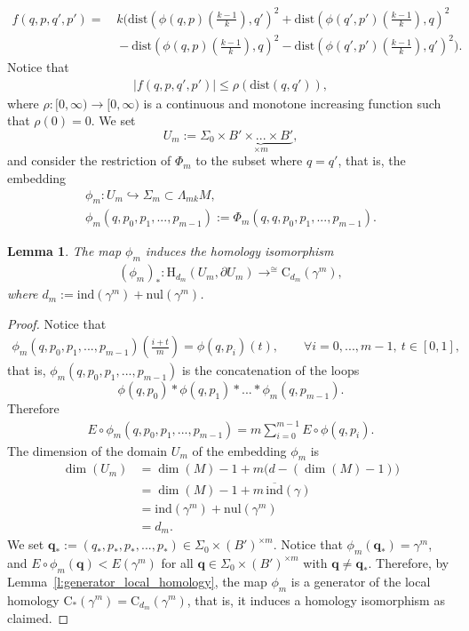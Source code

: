 \documentclass[reqno]{amsart}
\numberwithin{equation}{section}
\theoremstyle{personal}%
\newtheorem{lem}[thm]{Lemma}
\theoremstyle{definition}
\newcommand{\dist}{\mathrm{dist}}
\newcommand{\qq}{\bm{q}}
\newcommand{\Hom}{\mathrm{H}}
\newcommand{\Loc}{\mathrm{C}}
\newcommand{\avind}{\overline{\ind}}
\newcommand{\ind}{\mathrm{ind}}
\newcommand{\nul}{\mathrm{nul}}
\DeclareMathOperator*{\toup}{\longrightarrow}
\begin{document}
\begin{align*}
f(q,p,q',p')
=
&\, k
\Big(\dist(\phi(q,p)(\tfrac{k-1}{k}),q')^2 + \dist(\phi(q',p')(\tfrac{k-1}{k}),q)^2 \\
&
\,- \dist(\phi(q,p)(\tfrac{k-1}{k}),q)^2
- \dist(\phi(q',p')(\tfrac{k-1}{k}),q')^2
\Big).
\end{align*}
Notice that 
\begin{align}
\label{e:control_f}
|f(q,p,q',p')|\leq \rho(\dist(q,q')),
\end{align}
where $\rho:[0,\infty)\to[0,\infty)$ is a continuous and monotone increasing function such that $\rho(0)=0$.
We set 
\[
U_m:=\Sigma_0\times \underbrace{B'\times...\times B'}_{\times m},
\] 
and consider the restriction of $\Phi_m$ to the subset where $q=q'$, that is, the embedding
\begin{gather*}
\phi_m:U_m\hookrightarrow\Sigma_m\subset \Lambda_{mk}M,
\\
\phi_m(q,p_0,p_1,...,p_{m-1}):=\Phi_m(q,q,p_0,p_1,...,p_{m-1}).
\end{gather*}

\begin{lem}
The map $\phi_m$ induces the homology isomorphism
\begin{align*}
 (\phi_m)_*: \Hom_{d_m}(U_m,\partial U_m) \toup^{\cong} \Loc_{d_m}(\gamma^m),
\end{align*}
where $d_m:=\ind(\gamma^m)+\nul(\gamma^m)$.
\end{lem}

\begin{proof}
Notice that
\begin{align*}
\phi_m(q,p_0,p_1,...,p_{m-1})(\tfrac{i+t}m)
=
\phi(q,p_i)(t),\qquad
\forall i=0,...,m-1,\ t\in[0,1],
\end{align*}
that is, $\phi_m(q,p_0,p_1,...,p_{m-1})$ is the  concatenation of the loops 
\[\phi(q,p_0)*\phi(q,p_1)*...*\phi_m(q,p_{m-1}).\] Therefore
\begin{align*}
E\circ \phi_m(q,p_0,p_1,...,p_{m-1}) = m\sum_{i=0}^{m-1}E\circ\phi(q,p_i). 
\end{align*}
The dimension of the domain $U_m$ of the embedding $\phi_m$ is
\begin{align*}
 \dim(U_m)
 & =
 \dim(M)-1+m\big(d-(\dim(M)-1)\big)\\
 & = 
 \dim(M)-1 + m\,\avind(\gamma)\\
 & = 
 \ind(\gamma^m)+\nul(\gamma^m)\\
 & = d_m.
\end{align*}
We set 
$\qq_*:=(q_*,p_*,p_*,...,p_*)\in \Sigma_0\times (B')^{\times m}$. Notice that $\phi_m(\qq_*)=\gamma^m$, and $E\circ \phi_m(\qq)<E(\gamma^m)$ for all $\qq\in\Sigma_0\times (B')^{\times m}$ with $\qq\neq\qq_*$. Therefore, by Lemma~\ref{l:generator_local_homology}, the map $\phi_m$ is a generator of the local homology $\Loc_{*}(\gamma^m)=\Loc_{d_m}(\gamma^m)$, that is, it induces a homology isomorphism as claimed.
\end{proof}
\end{document}

